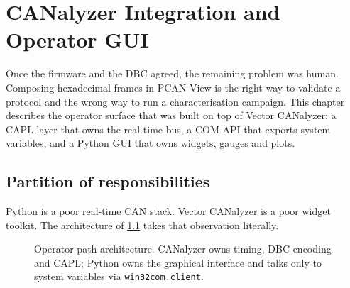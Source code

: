 \chapter{CANalyzer Integration and Operator GUI}
\label{ch:gui}

Once the firmware and the DBC agreed, the remaining problem was human.
Composing hexadecimal frames in PCAN-View is the right way to validate a
protocol and the wrong way to run a characterisation campaign. This
chapter describes the operator surface that was built on top of Vector
CANalyzer: a CAPL layer that owns the real-time bus, a COM API that
exports system variables, and a Python GUI that owns widgets, gauges and
plots.

\section{Partition of responsibilities}
\label{sec:partition}

Python is a poor real-time CAN stack. Vector CANalyzer is a poor widget
toolkit. The architecture of \cref{fig:gui-arch} takes that observation
literally.

\begin{figure}[ht]
\centering
{}
\caption{Operator-path architecture. CANalyzer owns timing, DBC encoding
and CAPL; Python owns the graphical interface and talks only to system
variables via \texttt{win32com.client}.}
\label{fig:gui-arch}
\end{figure}

